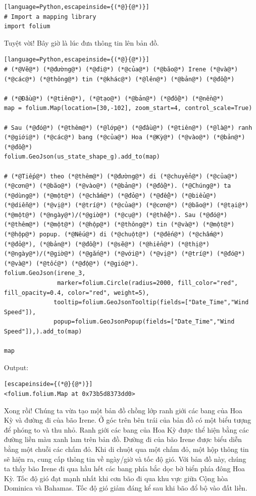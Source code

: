 \begin{lstlisting}[language=Python,escapeinside={(*@}{@*)}]
# Import a mapping library
import folium
\end{lstlisting}

Tuyệt vời! Bây giờ là lúc đưa thông tin lên bản đồ.

\begin{lstlisting}[language=Python,escapeinside={(*@}{@*)}]
# (*@Vẽ@*) (*@đường@*) (*@đi@*) (*@của@*) (*@bão@*) Irene (*@và@*) (*@các@*) (*@thông@*) tin (*@khác@*) (*@lên@*) (*@bản@*) (*@đồ@*)

# (*@Đầu@*) (*@tiên@*), (*@tạo@*) (*@bản@*) (*@đồ@*) (*@nền@*)
map = folium.Map(location=[30,-102], zoom_start=4, control_scale=True)

# Sau (*@đó@*) (*@thêm@*) (*@lớp@*) (*@đầu@*) (*@tiên@*) (*@là@*) ranh (*@giới@*) (*@các@*) bang (*@của@*) Hoa (*@Kỳ@*) (*@vào@*) (*@bản@*) (*@đồ@*)
folium.GeoJson(us_state_shape_g).add_to(map)

# (*@Tiếp@*) theo (*@thêm@*) (*@đường@*) di (*@chuyển@*) (*@của@*) (*@cơn@*) (*@bão@*) (*@vào@*) (*@bản@*) (*@đồ@*). (*@Chúng@*) ta (*@dùng@*) (*@một@*) (*@chấm@*) (*@đỏ@*) (*@để@*) (*@biểu@*) (*@diễn@*) (*@vị@*) (*@trí@*) (*@của@*) (*@cơn@*) (*@bão@*) (*@tại@*) (*@một@*) (*@ngày@*)/(*@giờ@*) (*@cụ@*) (*@thể@*). Sau (*@đó@*) (*@thêm@*) (*@một@*) (*@hộp@*) (*@thông@*) tin (*@và@*) (*@một@*) (*@hộp@*) popup. (*@Nếu@*) di (*@chuột@*) (*@đến@*) (*@chấm@*) (*@đỏ@*), (*@bản@*) (*@đồ@*) (*@sẽ@*) (*@hiển@*) (*@thị@*) (*@ngày@*)/(*@giờ@*) (*@gắn@*) (*@với@*) (*@vị@*) (*@trí@*) (*@đó@*) (*@và@*) (*@tốc@*) (*@độ@*) (*@gió@*).
folium.GeoJson(irene_3,
               marker=folium.Circle(radius=2000, fill_color="red", fill_opacity=0.4, color="red", weight=5),
              tooltip=folium.GeoJsonTooltip(fields=["Date_Time","Wind Speed"]),
              popup=folium.GeoJsonPopup(fields=["Date_Time","Wind Speed"]),).add_to(map)

map
\end{lstlisting}

Output:

\begin{lstlisting}[escapeinside={(*@}{@*)}]
<folium.folium.Map at 0x73b5d8373dd0>
\end{lstlisting}

Xong rồi! Chúng ta vừa tạo một bản đồ chồng lớp ranh giới các bang của Hoa Kỳ và đường đi của bão Irene. Ở góc trên bên trái của bản đồ có một biểu tượng để phóng to và thu nhỏ. Ranh giới các bang của Hoa Kỳ được thể hiện bằng các đường liền màu xanh lam trên bản đồ. Đường đi của bão Irene được biểu diễn bằng một chuỗi các chấm đỏ. Khi di chuột qua một chấm đỏ, một hộp thông tin sẽ hiện ra, cung cấp thông tin về ngày/giờ và tốc độ gió. Với bản đồ này, chúng ta thấy bão Irene đi qua hầu hết các bang phía bắc dọc bờ biển phía đông Hoa Kỳ. Tốc độ gió đạt mạnh nhất khi cơn bão đi qua khu vực giữa Cộng hòa Dominica và Bahamas. Tốc độ gió giảm đáng kể sau khi bão đổ bộ vào đất liền.

